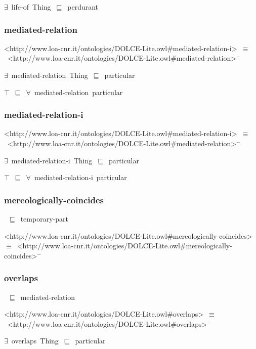 \documentclass{article}
\begin{document}
\ensuremath{\exists}~life-of~Thing~\ensuremath{\sqsubseteq}~perdurant

\subsubsection*{mediated-relation}

<http://www.loa-cnr.it/ontologies/DOLCE-Lite.owl#mediated-relation-i>~\ensuremath{\equiv}~<http://www.loa-cnr.it/ontologies/DOLCE-Lite.owl#mediated-relation>\ensuremath{^-}

\ensuremath{\exists}~mediated-relation~Thing~\ensuremath{\sqsubseteq}~particular

\ensuremath{\top}~\ensuremath{\sqsubseteq}~\ensuremath{\forall}~mediated-relation~particular

\subsubsection*{mediated-relation-i}

<http://www.loa-cnr.it/ontologies/DOLCE-Lite.owl#mediated-relation-i>~\ensuremath{\equiv}~<http://www.loa-cnr.it/ontologies/DOLCE-Lite.owl#mediated-relation>\ensuremath{^-}

\ensuremath{\exists}~mediated-relation-i~Thing~\ensuremath{\sqsubseteq}~particular

\ensuremath{\top}~\ensuremath{\sqsubseteq}~\ensuremath{\forall}~mediated-relation-i~particular

\subsubsection*{mereologically-coincides}

~\ensuremath{\sqsubseteq}~temporary-part

<http://www.loa-cnr.it/ontologies/DOLCE-Lite.owl#mereologically-coincides>~\ensuremath{\equiv}~<http://www.loa-cnr.it/ontologies/DOLCE-Lite.owl#mereologically-coincides>\ensuremath{^-}

\subsubsection*{overlaps}

~\ensuremath{\sqsubseteq}~mediated-relation

<http://www.loa-cnr.it/ontologies/DOLCE-Lite.owl#overlaps>~\ensuremath{\equiv}~<http://www.loa-cnr.it/ontologies/DOLCE-Lite.owl#overlaps>\ensuremath{^-}

\ensuremath{\exists}~overlaps~Thing~\ensuremath{\sqsubseteq}~particular
\end{document}
